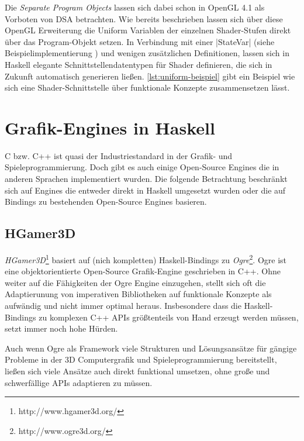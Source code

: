 Die \textit{Separate Program Objects} lassen sich dabei schon in OpenGL 4.1 als Vorboten von \ac{DSA} betrachten. Wie bereits beschrieben lassen sich über diese OpenGL Erweiterung die Uniform Variablen der einzelnen Shader-Stufen direkt über das Program-Objekt setzen. In Verbindung mit einer |StateVar| (siehe Beispielimplementierung ) und wenigen zusätzlichen Definitionen, lassen sich in Haskell elegante Schnittstellendatentypen für Shader definieren, die sich in Zukunft automatisch generieren ließen. \ref{lst:uniform-beispiel} gibt ein Beispiel wie sich eine Shader-Schnittstelle über funktionale Konzepte zusammensetzen lässt.

\endgroup


\section{Grafik-Engines in Haskell}

C bzw. C++ ist quasi der Industriestandard in der Grafik- und Spieleprogrammierung. Doch gibt es auch einige Open-Source Engines die in anderen Sprachen implementiert wurden. Die folgende Betrachtung beschränkt sich auf Engines die entweder direkt in Haskell umgesetzt wurden oder die auf Bindings zu bestehenden Open-Source Engines basieren.

\subsection{HGamer3D}

\textit{HGamer3D}\footnote{http://www.hgamer3d.org/} basiert auf (nich kompletten) Haskell-Bindings zu \textit{Ogre}\footnote{http://www.ogre3d.org/}. Ogre ist eine objektorientierte Open-Source Grafik-Engine geschrieben in C++. Ohne weiter auf die Fähigkeiten der Ogre Engine einzugehen, stellt sich oft die Adaptierunung von imperativen Bibliotheken auf funktionale Konzepte als aufwändig und nicht immer optimal heraus. Insbesondere dass die Haskell-Bindings zu komplexen C++ \acsp{API} größtenteils von Hand erzeugt werden müssen, setzt immer noch hohe Hürden.

Auch wenn Ogre als Framework viele Strukturen und Lösungsansätze für gängige Probleme in der 3D Computergrafik und Spieleprogrammierung bereitstellt, ließen sich viele Ansätze auch direkt funktional umsetzen, ohne große und schwerfällige \acsp{API} adaptieren zu müssen.

